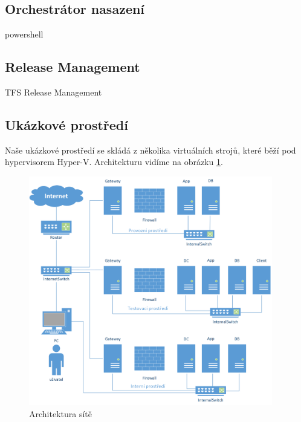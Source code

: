 \subsection{Orchestrátor nasazení}
powershell

\subsection{Release Management}
TFS Release Management

\subsection{Ukázkové prostředí}
Naše ukázkové prostředí se skládá z několika virtuálních strojů, které běží pod hypervisorem Hyper-V. Architekturu vidíme na obrázku \ref{fig:architekturasite}. 

\begin{figure}[]
  \centering
  \includegraphics[height=10cm]{fig/network.png}
  \caption{Architektura sítě}
  \label{fig:architekturasite}
\end{figure}

